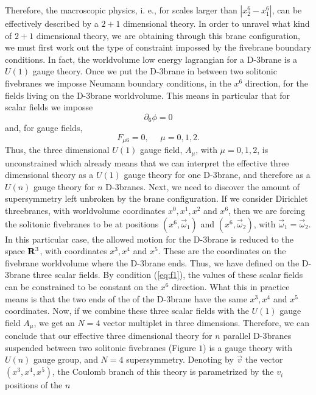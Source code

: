 Therefore, the macroscopic physics, i. e., for scales 
larger than $|x^6_2-x^6_1|$, can be effectively described by a
$2+1$ dimensional theory. In order to unravel what kind of $2+1$
dimensional theory, we are obtaining through this brane
configuration, we must first work out the type of constraint
impossed by the fivebrane boundary conditions. In fact, the
worldvolume low energy lagrangian for a D-$3$brane is a $U(1)$
gauge theory. Once we put the D-$3$brane in between two solitonic
fivebranes we imposse Neumann boundary conditions, in the $x^6$
direction, for the fields living on the D-$3$brane worldvolume.
This means in particular that for scalar fields we imposse
\begin{equation}
\partial_6 \phi =0
\label{eq:f1}
\end{equation}
and, for gauge fields,
\begin{equation}
F_{\mu 6} =0, \: \: \: \: \: \: \mu=0,1,2.
\label{eq:f2}
\end{equation}
Thus, the three dimensional $U(1)$ gauge field, $A_{\mu}$, with
$\mu=0,1,2$, is unconstrained which already means that we can
interpret the effective three dimensional theory as a $U(1)$
gauge theory for one D-$3$brane, and therefore as a $U(n)$ gauge
theory for $n$ D-$3$branes. Next, we need to discover the amount
of supersymmetry left unbroken by the brane configuration. If we
consider Dirichlet threebranes, with worldvolume coordinates
$x^0,x^1,x^2$ and $x^6$, then we are forcing the solitonic
fivebranes to be at positions $(x^6,\vec{\omega}_1)$ and
$(x^6,\vec{\omega}_2)$, with $\vec{\omega}_1=\vec{\omega}_2$. In
this particular case, the allowed motion for the D-$3$brane is
reduced to the space ${\bf R}^3$, with coordinates $x^3,x^4$ and
$x^5$. These are the coordinates on the fivebrane worldvolume
where the D-$3$brane ends. Thus, we have defined on the
D-$3$brane three scalar fields. By condition (\ref{eq:f1}), the
values of these scalar fields can be constrained to be constant
on the $x^6$ direction. What this in practice means is that the
two ends of the of the D-$3$brane have the same $x^3,x^4$ and
$x^5$ coordinates. Now, if we combine these three scalar fields
with the $U(1)$ gauge field $A_{\mu}$, we get an $N=4$ vector
multiplet in three dimensions. Therefore, we can conclude that
our effective three dimensional theory for $n$ parallel
D-$3$branes suspended between two solitonic fivebranes (Figure $1$) is a gauge
theory with $U(n)$ gauge group, and $N=4$ supersymmetry. Denoting
by $\vec{v}$ the vector $(x^3,x^4,x^5)$, the Coulomb branch of
this theory is parametrized by the $v_i$ positions of the $n$
